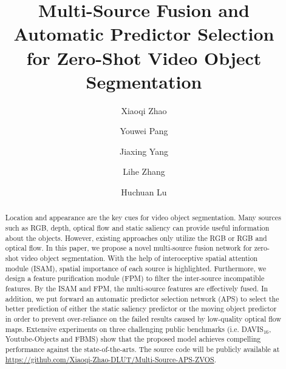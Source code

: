\documentclass[sigconf]{acmart}
\begin{document}
\fancyhead{}
\title{Multi-Source Fusion and Automatic Predictor Selection \\ for Zero-Shot Video Object Segmentation}





\author{Xiaoqi Zhao}
\author{Youwei Pang}
\author{Jiaxing Yang}

\author{Lihe Zhang}
\authornotemark[0]
\author{Huchuan Lu}






\begin{abstract}
  Location and appearance are the key cues for video object segmentation. Many sources such as RGB, depth, optical flow and static saliency can provide useful information about the objects. However, existing approaches only utilize the RGB or RGB and optical flow. 
In this paper, we propose a novel multi-source fusion network for zero-shot video object segmentation. With the help of interoceptive spatial attention module (ISAM), spatial importance  of each source is highlighted. Furthermore, we design a feature purification module (FPM) to filter the inter-source incompatible features. By the ISAM and FPM, the multi-source features are effectively fused.
In addition, we put forward an automatic predictor selection network (APS) to select the better prediction of either the static saliency predictor or the moving object predictor in order to prevent over-reliance on the failed results caused by low-quality optical flow maps. 
Extensive experiments on three challenging public benchmarks (i.e. DAVIS$_{16}$, Youtube-Objects and FBMS) show that the proposed model achieves compelling performance against the state-of-the-arts. The source code will be publicly available at \textcolor{red}{\url{https://github.com/Xiaoqi-Zhao-DLUT/Multi-Source-APS-ZVOS}}.
\end{abstract}
\end{document}
